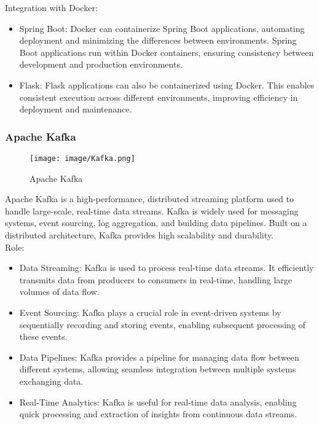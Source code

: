 \documentclass[conference]{IEEEtran}
\begin{document}
Integration with Docker:
\begin{itemize}
    \item Spring Boot: Docker can containerize Spring Boot applications, automating deployment and minimizing the differences between environments. Spring Boot applications run within Docker containers, ensuring consistency between development and production environments.\\
    \item Flask: Flask applications can also be containerized using Docker. This enables consistent execution across different environments, improving efficiency in deployment and maintenance.\\
\end{itemize}


\subsubsection{Apache Kafka}

\begin{figure}[h!]
    \centering
    \texttt{[image: image/Kafka.png]}
    \caption{Apache Kafka}
    \label{fig:enter-label}
\end{figure}

\noindent Apache Kafka is a high-performance, distributed streaming platform used to handle large-scale, real-time data streams. Kafka is widely used for messaging systems, event sourcing, log aggregation, and building data pipelines. Built on a distributed architecture, Kafka provides high scalability and durability.\\

Role:
\begin{itemize}
    \item Data Streaming: Kafka is used to process real-time data streams. It efficiently transmits data from producers to consumers in real-time, handling large volumes of data flow.\\
    \item Event Sourcing: Kafka plays a crucial role in event-driven systems by sequentially recording and storing events, enabling subsequent processing of these events.\\
    \item Data Pipelines: Kafka provides a pipeline for managing data flow between different systems, allowing seamless integration between multiple systems exchanging data.\\
    \item Real-Time Analytics: Kafka is useful for real-time data analysis, enabling quick processing and extraction of insights from continuous data streams.\\
\end{itemize}
\end{document}
